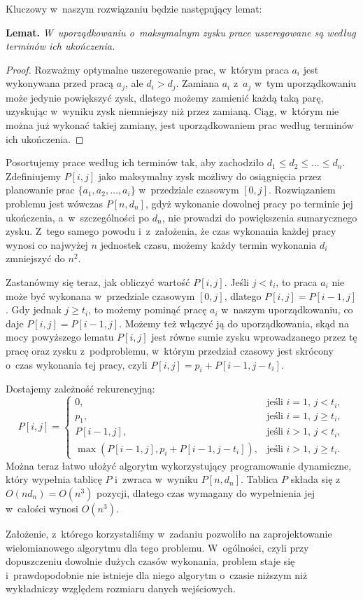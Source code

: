 Kluczowy w~naszym rozwiązaniu będzie następujący lemat:

\medskip
\noindent\textsf{\textbf{Lemat.}} \textit{W~uporządkowaniu o~maksymalnym zysku prace uszeregowane są według terminów ich ukończenia.}
\begin{proof}
Rozważmy optymalne uszeregowanie prac, w~którym praca $a_i$ jest wykonywana przed pracą $a_j$, ale $d_i>d_j$.
Zamiana $a_i$ z~$a_j$ w~tym uporządkowaniu może jedynie powiększyć zysk, dlatego możemy zamienić każdą taką parę, uzyskując w~wyniku zysk niemniejszy niż przez zamianą.
Ciąg, w~którym nie można już wykonać takiej zamiany, jest uporządkowaniem prac według terminów ich ukończenia.
\end{proof}

Posortujemy prace według ich terminów tak, aby zachodziło $d_1\le d_2\le\dots\le d_n$.
Zdefiniujemy $P[i,j]$ jako maksymalny zysk możliwy do osiągnięcia przez planowanie prac $\{a_1,a_2,\dots,a_i\}$ w~przedziale czasowym $[0,j]$.
Rozwiązaniem problemu jest wówczas $P[n,d_n]$, gdyż wykonanie dowolnej pracy po terminie jej ukończenia, a~w~szczególności po $d_n$, nie prowadzi do powiększenia sumarycznego zysku.
Z~tego samego powodu i~z~założenia, że czas wykonania każdej pracy wynosi co najwyżej $n$ jednostek czasu, możemy każdy termin wykonania $d_i$ zmniejszyć do $n^2$.

Zastanówmy się teraz, jak obliczyć wartość $P[i,j]$.
Jeśli $j<t_i$, to praca $a_i$ nie może być wykonana w~przedziale czasowym $[0,j]$, dlatego $P[i,j]=P[i-1,j]$.
Gdy jednak $j\ge t_i$, to możemy pominąć pracę $a_i$ w~naszym uporządkowaniu, co daje $P[i,j]=P[i-1,j]$.
Możemy też włączyć ją do uporządkowania, skąd na mocy powyższego lematu $P[i,j]$ jest równe sumie zysku wprowadzanego przez tę pracę oraz zysku z~podproblemu, w~którym przedział czasowy jest skrócony o~czas wykonania tej pracy, czyli $P[i,j]=p_i+P[i-1,j-t_i]$.

Dostajemy zależność rekurencyjną:
\[
	P[i,j] = \begin{cases}
		0, & \text{jeśli $i=1$, $j<t_i$}, \\
		p_1, & \text{jeśli $i=1$, $j\ge t_i$}, \\
		P[i-1,j], & \text{jeśli $i>1$, $j<t_i$}, \\
		\max(P[i-1,j],p_i+P[i-1,j-t_i]), & \text{jeśli $i>1$, $j\ge t_i$}.
	\end{cases}
\]
Można teraz łatwo ułożyć algorytm wykorzystujący programowanie dynamiczne, który wypełnia tablicę $P$ i~zwraca w~wyniku $P[n,d_n]$.
Tablica $P$ składa się z~$O(nd_n)=O(n^3)$ pozycji, dlatego czas wymagany do wypełnienia jej w~całości wynosi $O(n^3)$.

Założenie, z~którego korzystaliśmy w~zadaniu pozwoliło na zaprojektowanie wielomianowego algorytmu dla tego problemu.
W~ogólności, czyli przy dopuszczeniu dowolnie dużych czasów wykonania, problem staje się  i~prawdopodobnie nie istnieje dla niego algorytm o~czasie niższym niż wykładniczy względem rozmiaru danych wejściowych.
